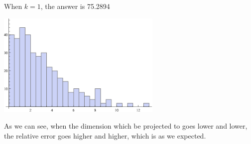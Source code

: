 \documentclass[a4paper, 12pt]{mcshw}
\begin{document}
\begin{enumerate}
\begin{solution}
\begin{center}
        \end{center}
        When $k = 1$, the answer is 75.2894
        \begin{center}
            \includegraphics[height=5cm]{1_gr8.eps}
        \end{center}
        As we can see, when the dimension which be projected to goes lower and lower, the relative error goes higher and higher, which is as we expected.
    \end{solution}
\end{enumerate}
\end{document}
